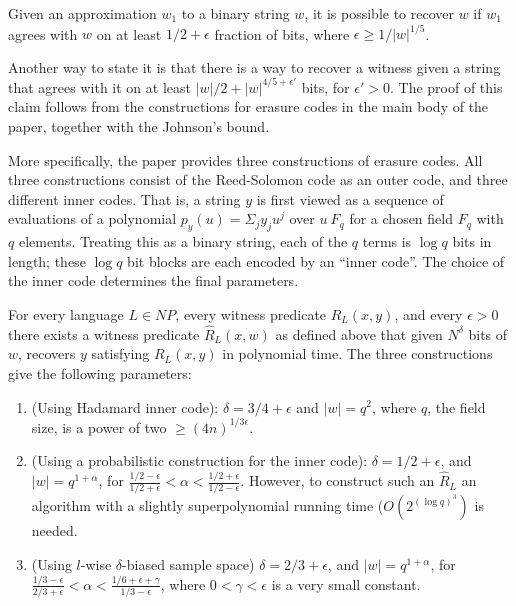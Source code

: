 \begin{theorem}[\cite{KS99}]
Given an approximation $w_1$ to a binary string $w$, it is possible to
recover $w$ if $w_1$ agrees with $w$ on at least $1/2+\epsilon$
fraction of bits, where $\epsilon \geq 1/|w|^{1/5}$. 
\end{theorem}

Another way to state it is that there is a way to recover a witness
given a string that agrees with it on at least
$|w|/2+|w|^{4/5+\epsilon'}$ bits, for $\epsilon'>0$.  The proof of
this claim follows from the constructions for erasure codes in the
main body of the paper, together with the Johnson's bound.

More specifically, the paper provides three constructions of
erasure codes. All three constructions consist of the Reed-Solomon
code as an outer code, and three different inner codes. That is, a
string $y$ is first viewed as a sequence of evaluations of a
polynomial $p_y(u)= \Sigma_j y_j u^j$ over $u\ F_q$ for a chosen field
$F_q$ with $q$ elements. Treating this as a binary string, each of the
$q$ terms is $\log q$ bits in length; these $\log q$ bit blocks are
each encoded by an ``inner code''. The choice of the inner code
determines the final parameters.   

\begin{theorem}[\cite{KS99}]
For every language $L \in NP$, every witness predicate $R_L(x,y)$, and
every $\epsilon >0$ there exists a witness predicate $\hat{R}_L(x,w)$
as defined above that given $N^\delta$ bits of $w$, recovers $y$
satisfying $R_L(x,y)$ in polynomial time. The three constructions give
the following parameters:
\begin{enumerate}
\item (Using Hadamard inner code): $\delta = 3/4+\epsilon$ and 
 $|w|=q^2$, where $q$, the field size,  is a power of two $\geq (4n)^{1/{3\epsilon}}$.   
\item (Using a probabilistic construction for the inner code): $\delta
= 1/2+\epsilon$, and $|w|=q^{1+\alpha}$,  for
$\frac{1/2-\epsilon}{1/2+\epsilon} < \alpha <
\frac{1/2+\epsilon}{1/2-\epsilon}$. However,  to construct such an $\hat{R}_L$
an algorithm with a slightly superpolynomial running time ($O(2^{(\log
q)^3})$ is needed.
\item (Using $l$-wise $\delta$-biased sample space)    
$\delta
= 2/3+\epsilon$, and $|w|=q^{1+\alpha}$,  for
$\frac{1/3-\epsilon}{2/3+\epsilon} < \alpha <
\frac{1/6+\epsilon+\gamma}{1/3-\epsilon}$, where $0 < \gamma <
\epsilon$ is a very small constant.  
\end{enumerate}
\end{theorem} 


